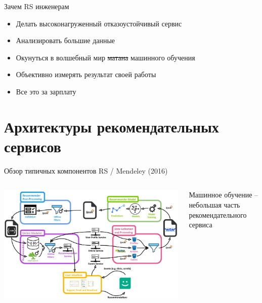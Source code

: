 \documentclass[11pt,aspectratio=169]{beamer}
\begin{document}
\begin{frame}{Зачем RS инженерам}

\begin{itemize}
\item Делать высоконагруженный отказоустойчивый сервис
\item Анализировать большие данные
\item Окунуться в волшебный мир \sout{матана} машинного обучения
\item Объективно измерять результат своей работы 
\item Все это за зарплату
\end{itemize}

\end{frame}

\section{Архитектуры рекомендательных сервисов}

\begin{frame}{Обзор типичных компонентов RS / Mendeley (2016) \cite{MNDL}}
\begin{columns}
\begin{column}{0.6\textwidth}
   \begin{center}
		\includegraphics[scale=0.2]{images/mendeley.jpeg}
   \end{center}
\end{column}
\begin{column}{0.3\textwidth}
    \begin{tcolorbox}[colback=info!5,colframe=info!80,title=]
    Машинное обучение -- небольшая часть рекомендательного сервиса
    \end{tcolorbox}
\end{column}
\end{columns}

\end{frame}
\end{document}
